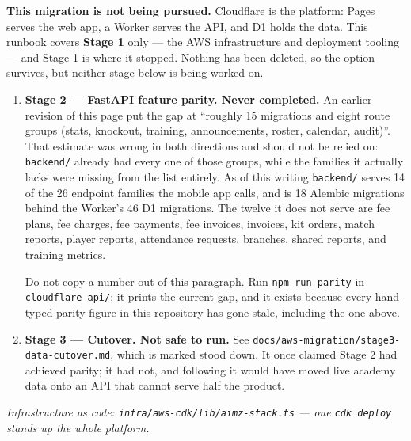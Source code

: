\documentclass[11pt,a4paper]{article}
\begin{document}
\textbf{This migration is not being pursued.} Cloudflare is the platform:
Pages serves the web app, a Worker serves the API, and D1 holds the data.
This runbook covers \textbf{Stage 1} only --- the AWS infrastructure and
deployment tooling --- and Stage 1 is where it stopped. Nothing has been
deleted, so the option survives, but neither stage below is being worked on.

\begin{enumerate}[leftmargin=1.6em]
  \item \textbf{Stage 2 --- FastAPI feature parity. Never completed.} An
        earlier revision of this page put the gap at ``roughly 15 migrations and
        eight route groups (stats, knockout, training, announcements, roster,
        calendar, audit)''. That estimate was wrong in both directions and
        should not be relied on: \texttt{backend/} already had every one of
        those groups, while the families it actually lacks were missing from
        the list entirely. As of this writing \texttt{backend/} serves 14 of
        the 26 endpoint families the mobile app calls, and is 18 Alembic
        migrations behind the Worker's 46 D1 migrations. The twelve it does
        not serve are fee plans, fee charges, fee payments, fee invoices,
        invoices, kit orders, match reports, player reports, attendance
        requests, branches, shared reports, and training metrics.

        Do not copy a number out of this paragraph. Run \texttt{npm run parity}
        in \texttt{cloudflare-api/}; it prints the current gap, and it exists
        because every hand-typed parity figure in this repository has gone
        stale, including the one above.
  \item \textbf{Stage 3 --- Cutover. Not safe to run.} See
        \texttt{docs/aws-migration/stage3-data-cutover.md}, which is marked
        stood down. It once claimed Stage 2 had achieved parity; it had not,
        and following it would have moved live academy data onto an API that
        cannot serve half the product.
\end{enumerate}

\vfill
\begin{center}\small
\textit{Infrastructure as code: \texttt{infra/aws-cdk/lib/aimz-stack.ts} ---
one \texttt{cdk deploy} stands up the whole platform.}
\end{center}
\end{document}
